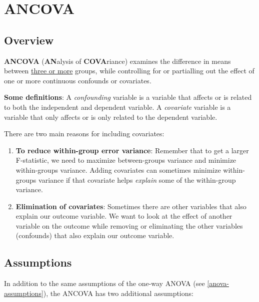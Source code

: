 \documentclass[
]{book}
\begin{document}
\hypertarget{ancova}{%
\section{ANCOVA}\label{ancova}}

\hypertarget{overview-9}{%
\subsection{Overview}\label{overview-9}}

\textbf{ANCOVA} (\textbf{AN}alysis of \textbf{COVA}riance) examines the difference in means between \underline{three or more} groups, while controlling for or partialling out the effect of one or more continuous confounds or covariates.

\textbf{Some definitions}: A \emph{confounding} variable is a variable that affects or is related to both the independent and dependent variable. A \emph{covariate} variable is a variable that only affects or is only related to the dependent variable.

There are two main reasons for including covariates:

\begin{enumerate}
\def\labelenumi{\arabic{enumi}.}
\item
  \textbf{To reduce within-group error variance}: Remember that to get a larger F-statistic, we need to maximize between-groups variance and minimize within-groups variance. Adding covariates can sometimes minimize within-groups variance if that covariate helps \emph{explain} some of the within-group variance.
\item
  \textbf{Elimination of covariates}: Sometimes there are other variables that also explain our outcome variable. We want to look at the effect of another variable on the outcome while removing or eliminating the other variables (confounds) that also explain our outcome variable.
\end{enumerate}

\hypertarget{assumptions-5}{%
\subsection{Assumptions}\label{assumptions-5}}

In addition to the same assumptions of the one-way ANOVA (see \ref{anova-assumptions}), the ANCOVA has two additional assumptions:
\end{document}
